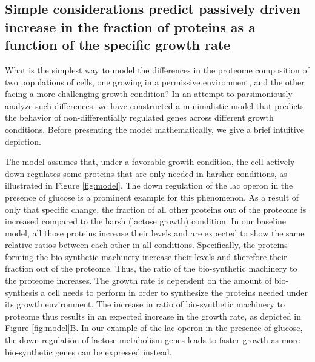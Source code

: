 \subsection{Simple considerations predict passively driven increase in the fraction of proteins as a function of the specific growth rate}
What is the simplest way to model the differences in the proteome composition of two populations of cells, one growing in a permissive environment, and the other facing a more challenging growth condition?
In an attempt to parsimoniously analyze such differences, we have constructed a minimalistic model that predicts the behavior of non-differentially regulated genes across different growth conditions.
Before presenting the model mathematically, we give a brief intuitive depiction.

The model assumes that, under a favorable growth condition, the cell actively down-regulates some proteins that are only needed in harsher conditions, as illustrated in Figure \ref{fig:model}.
The down regulation of the lac operon in the presence of glucose is a prominent example for this phenomenon. 
As a result of only that specific change, the fraction of all other proteins out of the proteome is increased compared to the harsh (lactose growth) condition.
In our baseline model, all those proteins increase their levels and are expected to show the same relative ratios between each other in all conditions. 
Specifically, the proteins forming the bio-synthetic machinery increase their levels and therefore their fraction out of the proteome.
Thus, the ratio of the bio-synthetic machinery to the proteome increases.
The growth rate is dependent on the amount of bio-synthesis a cell needs to perform in order to synthesize the proteins needed under its growth environment.
The increase in ratio of bio-synthetic machinery to proteome thus results in an expected increase in the growth rate, as  depicted in Figure \ref{fig:model}B.
In our example of the lac operon in the presence of glucose, the down regulation of lactose metabolism genes leads to faster growth as more bio-synthetic genes can be expressed instead.